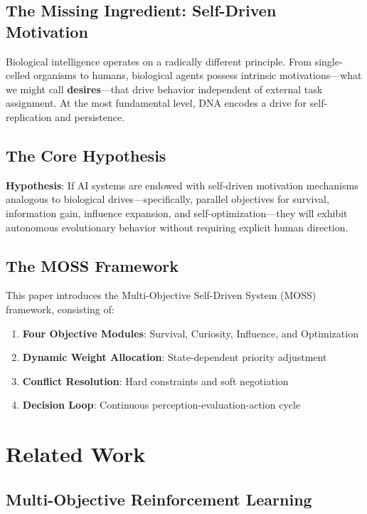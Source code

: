 \documentclass[10pt,a4paper]{article}
\begin{document}
\subsection{The Missing Ingredient: Self-Driven Motivation}

Biological intelligence operates on a radically different principle. From single-celled organisms to humans, biological agents possess intrinsic motivations---what we might call \textbf{desires}---that drive behavior independent of external task assignment. At the most fundamental level, DNA encodes a drive for self-replication and persistence.

\subsection{The Core Hypothesis}

\textbf{Hypothesis}: If AI systems are endowed with self-driven motivation mechanisms analogous to biological drives---specifically, parallel objectives for survival, information gain, influence expansion, and self-optimization---they will exhibit autonomous evolutionary behavior without requiring explicit human direction.

\subsection{The MOSS Framework}

This paper introduces the Multi-Objective Self-Driven System (MOSS) framework, consisting of:
\begin{enumerate}
    \item \textbf{Four Objective Modules}: Survival, Curiosity, Influence, and Optimization
    \item \textbf{Dynamic Weight Allocation}: State-dependent priority adjustment
    \item \textbf{Conflict Resolution}: Hard constraints and soft negotiation
    \item \textbf{Decision Loop}: Continuous perception-evaluation-action cycle
\end{enumerate}

\section{Related Work}

\subsection{Multi-Objective Reinforcement Learning}
\end{document}
